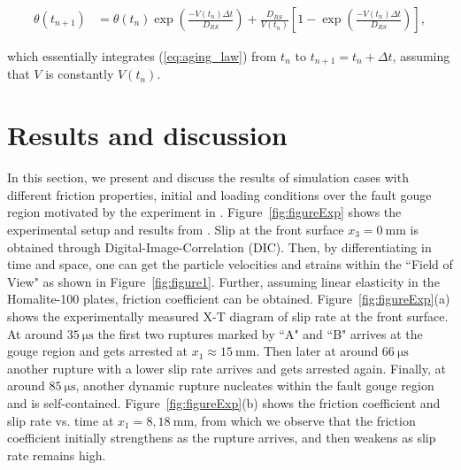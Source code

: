 \documentclass[final,a4paper]{elsarticle}
\begin{document}
\begin{align}
    \theta(t_{n+1}) &= \theta(t_n)\exp\left(\frac{-V(t_n)\Delta t}{D_{RS}}\right) + \frac{D_{RS}}{V(t_n)}\left[1 - \exp\left(\frac{-V(t_n)\Delta t}{D_{RS}}\right)\right],  \label{eq:advancingTheta}
\end{align}

\noindent which essentially integrates (\ref{eq:aging_law}) from $t_n$ to $t_{n+1}=t_n + \Delta t$, 
assuming that $V$ is constantly $V(t_n)$. 

\section{Results and discussion}
\label{sec:resultsAndDiscussion}
In this section, 
we present and discuss the results of simulation cases with different friction properties, initial and loading conditions over the fault gouge region motivated by the experiment in \cite{Rubino2022}. 
Figure~\ref{fig:figureExp} shows the experimental setup and results from \cite{Rubino2022}.  
Slip at the front surface $x_3 = 0\ \mathrm{mm}$ is obtained through Digital-Image-Correlation (DIC). 
Then,
by differentiating in time and space, 
one can get the particle velocities and strains within the ``Field of View" as shown in Figure~\ref{fig:figure1}. 
Further,
assuming linear elasticity in the Homalite-100 plates, 
friction coefficient can be obtained. 
Figure~\ref{fig:figureExp}(a) shows the experimentally measured X-T diagram of slip rate at the front surface. 
At around $35\ \mathrm{\mu s}$ the first two ruptures marked by ``A" and ``B" arrives at the gouge region and gets arrested at $x_1 \approx 15\ \mathrm{mm}$. 
Then later at around $66\ \mathrm{\mu s}$ another rupture with a lower slip rate arrives and gets arrested again. 
Finally, 
at around $85\ \mathrm{\mu s}$, 
another dynamic rupture nucleates within the fault gouge region and is self-contained.
Figure~\ref{fig:figureExp}(b) shows the friction coefficient and slip rate vs. time at $x_1 = 8, 18\ \mathrm{mm}$, 
from which we observe that the friction coefficient initially strengthens as the rupture arrives, 
and then weakens as slip rate remains high. 
\end{document}
